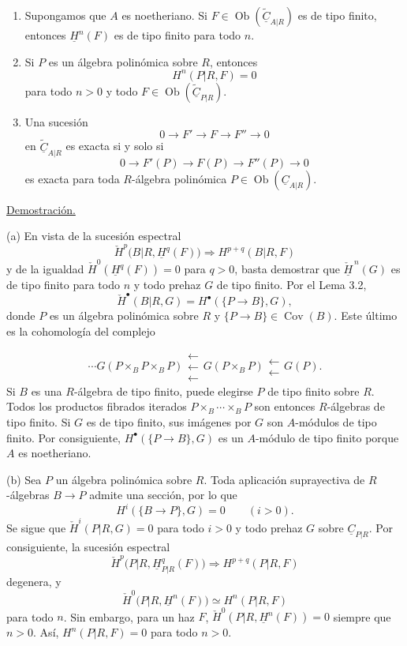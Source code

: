 \begin{enumerate}[label=(\alph*)]
\item Supongamos que $A$ es noetheriano. Si
$F\in\operatorname{Ob}(\widetilde{\underline C}_{A|R})$ es de tipo
finito, entonces $\underline H^n(F)$ es de tipo finito para todo $n$.

\item Si $P$ es un álgebra polinómica sobre $R$, entonces
\[
 H^n(P|R,F)=0
\]
para todo $n>0$ y todo
$F\in\operatorname{Ob}(\widetilde{\underline C}_{P|R})$.

\item Una sucesión
\[
 0\longrightarrow F'\longrightarrow F\longrightarrow F''
 \longrightarrow0
\]
en $\widetilde{\underline C}_{A|R}$ es exacta si y solo si
\[
 0\longrightarrow F'(P)\longrightarrow F(P)
 \longrightarrow F''(P)\longrightarrow0
\]
es exacta para toda $R$-álgebra polinómica
$P\in\operatorname{Ob}(\underline C_{A|R})$.
\end{enumerate}

\underline{Demostración.}

(a) En vista de la sucesión espectral
\[
 \check H^p\bigl(B|R,\underline H^q(F)\bigr)
 \Longrightarrow H^{p+q}(B|R,F)
\]
y de la igualdad
$\check H^0(\underline H^q(F))=0$ para $q>0$, basta demostrar que
$\check{\underline H}^{\,n}(G)$ es de tipo finito para todo $n$ y todo
prehaz $G$ de tipo finito. Por el Lema 3.2,
\[
 \check H^{\bullet}(B|R,G)=
 H^{\bullet}(\{P\longrightarrow B\},G),
\]
donde $P$ es un álgebra polinómica sobre $R$ y
$\{P\longrightarrow B\}\in\operatorname{Cov}(B)$. Este último es la
cohomología del complejo


\[
 \cdots
 G(P\times_BP\times_BP)
 \mathrel{\substack{\longleftarrow\\[-.6ex]\longleftarrow\\[-.6ex]\longleftarrow}}
 G(P\times_BP)
 \mathrel{\substack{\longleftarrow\\[-.6ex]\longleftarrow}}
 G(P).
\]
Si $B$ es una $R$-álgebra de tipo finito, puede elegirse $P$ de tipo
finito sobre $R$. Todos los productos fibrados iterados
$P\times_B\cdots\times_BP$ son entonces $R$-álgebras de tipo finito. Si
$G$ es de tipo finito, sus imágenes por $G$ son $A$-módulos de tipo
finito. Por consiguiente,
$H^{\bullet}(\{P\longrightarrow B\},G)$ es un $A$-módulo de tipo finito
porque $A$ es noetheriano.

(b) Sea $P$ un álgebra polinómica sobre $R$. Toda aplicación suprayectiva
de $R$-álgebras $B\longrightarrow P$ admite una sección, por lo que
\[
 H^i(\{B\longrightarrow P\},G)=0\qquad(i>0).
\]
Se sigue que $\check H^i(P|R,G)=0$ para todo $i>0$ y todo prehaz $G$
sobre $\underline C_{P|R}$. Por consiguiente, la sucesión espectral
\[
 \check H^p\bigl(P|R,\underline H^q_{P|R}(F)\bigr)
 \Longrightarrow H^{p+q}(P|R,F)
\]
degenera, y
\[
 \check H^0\bigl(P|R,\underline H^n(F)\bigr)
 \simeq H^n(P|R,F)
\]
para todo $n$. Sin embargo, para un haz $F$,
$\check H^0(P|R,\underline H^n(F))=0$ siempre que $n>0$. Así,
$H^n(P|R,F)=0$ para todo $n>0$.

